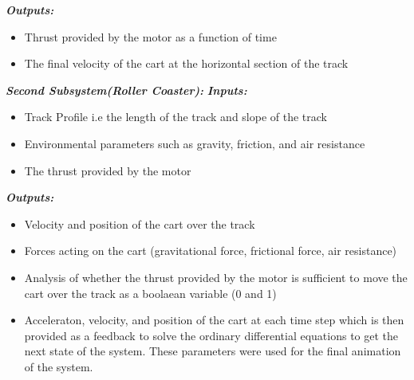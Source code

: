 \documentclass{article}
\begin{document}
    \textbf{\textit{Outputs:}}
    \begin{itemize}
        \item Thrust provided by the motor as a function of time

        \item The final velocity of the cart at the horizontal section of the track
    \end{itemize}
    \textbf{\textit{Second Subsystem(Roller Coaster):}}
    \newline
    \textbf{\textit{Inputs:}}
    \begin{itemize}
        \item Track Profile i.e the length of the track and slope of the track

        \item Environmental parameters such as gravity, friction, and air resistance

        \item The thrust provided by the motor
    \end{itemize}
    \textbf{\textit{Outputs:}}
    \begin{itemize}
        \item Velocity and position of the cart over the track

        \item Forces acting on the cart (gravitational force, frictional force,
            air resistance)

        \item Analysis of whether the thrust provided by the motor is sufficient
            to move the cart over the track as a boolaean variable (0 and 1)

        \item Acceleraton, velocity, and position of the cart at each time step which
            is then provided as a feedback to solve the ordinary differential equations
            to get the next state of the system. These parameters were used for
            the final animation of the system.
    \end{itemize}
\end{document}
